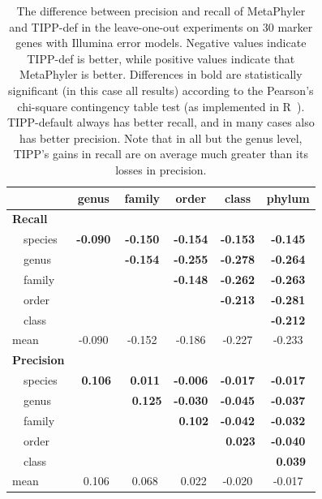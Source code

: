 \begin{table}[hptb]
\caption[Precision-Recall Differences on 30 marker genes, Illumina]{\label{tipp:difference.leaveout.illumina.30} The difference between precision and recall of MetaPhyler and TIPP-def in the leave-one-out experiments on 30 marker genes with Illumina error models. Negative values
indicate TIPP-def is better, while positive values indicate that MetaPhyler is better. Differences in bold are statistically significant (in this case all results) according to the Pearson's chi-square contingency table test (as implemented in R~\cite{R}).
TIPP-default always has better recall, and in many cases also has better precision.
Note that in all but the genus level, TIPP's gains in recall are on average much greater than its losses in precision.}
\begin{center}
\begin{tabular}{|l||c|c|c|c|c|} \hline
\multicolumn{1}{|l||}{}&\multicolumn{1}{c|}{genus}&\multicolumn{1}{c|}{family}&\multicolumn{1}{c|}{order}&\multicolumn{1}{c|}{class}&\multicolumn{1}{c|}{phylum}\\ \hline
{\bf Recall}&&&&&\\
~~species&{\bf -0.090}&{\bf -0.150}&{\bf -0.154}&{\bf -0.153}&{\bf -0.145}\\ 
~~genus&&{\bf -0.154}&{\bf -0.255}&{\bf -0.278}&{\bf -0.264}\\ 
~~family&&&{\bf -0.148}&{\bf -0.262}&{\bf -0.263}\\ 
~~order&&&&{\bf -0.213}&{\bf -0.281}\\ 
~~class&&&&&{\bf -0.212}\\
mean&-0.090&-0.152&-0.186&-0.227&-0.233\\ 
 \hline
{\bf Precision}&&&&&\\
~~species&~{\bf 0.106}&~{\bf 0.011}&{\bf -0.006}&{\bf -0.017}&{\bf -0.017}\\ 
~~genus&&~ {\bf 0.125}&{\bf -0.030}&{\bf -0.045}&{\bf -0.037}\\ 
~~family&&&~{\bf 0.102}&{\bf -0.042}&{\bf -0.032}\\ 
~~order&&&&~{\bf 0.023}&{\bf -0.040}\\ 
~~class&&&&&~{\bf 0.039}\\ 
mean&~0.106&~0.068&~0.022&-0.020&-0.017\\ 
\hline
\end{tabular}
\end{center}
\end{table}



